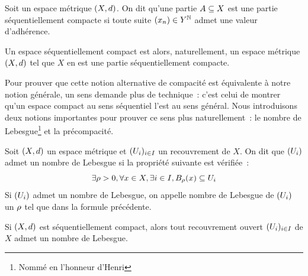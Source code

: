 \begin{definition}
  Soit un espace métrique $(X,d)$. On dit qu'une partie
  $A\subseteq X$ est une partie séquentiellement compacte si toute suite
  $(x_n)\in Y^{\mathbb N}$ admet une valeur d'adhérence.
\end{definition}

Un espace séquentiellement compact est alors, naturellement, un espace métrique
$(X,d)$ tel que $X$ en est une partie séquentiellement compacte.

Pour prouver que cette notion alternative de compacité est équivalente à notre
notion générale, un sens demande plus de technique~: c'est celui de montrer
qu'un espace compact au sens séquentiel l'est au sens général. Nous introduisons
deux notions importantes pour prouver ce sens plus naturellement~: le nombre de
Lebesgue\footnote{Nommé en l'honneur d'Henri } et la
précompacité.

\begin{definition}
  Soit $(X,d)$ un espace métrique et $(U_i)_{i\in I}$ un recouvrement
  de $X$. On dit que $(U_i)$ admet un nombre de Lebesgue si la propriété
  suivante est vérifiée~:
  \[\exists \rho > 0,\forall x \in X, \exists i \in I,
  B_{\rho}(x)\subseteq U_i \]
  Si $(U_i)$ admet un nombre de Lebesgue, on appelle nombre de Lebesgue de
  $(U_i)$ un $\rho$ tel que dans la formule précédente.
\end{definition}

\begin{lemma}\label{lem.nb.lebesgue}
  Si $(X,d)$ est séquentiellement compact, alors tout recouvrement ouvert
  $(U_i)_{i\in I}$ de $X$ admet un nombre de Lebesgue.
\end{lemma}

